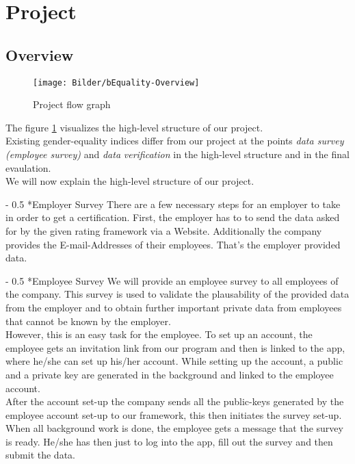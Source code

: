 \documentclass[portrait,a4paper]{article}
\makeatletter
\renewcommand\paragraph{\@startsection{paragraph}{4}{0mm}%
	{-\baselineskip}%
	{0.5\baselineskip}%
	{\normalfont\bfseries}%
}%
\makeatother
\begin{document}
\section{Project}
	\subsection{Overview}
		\begin{figure}[H]
			\texttt{[image: Bilder/bEquality-Overview]}
			\caption{Project flow graph}
			\label{Project_flow_graph}
		\end{figure}

		The figure \ref{Project_flow_graph} visualizes the high-level structure of our project.\\
		Existing gender-equality indices differ from our project at the points 
		\textit{data survey (employee survey)} and \textit{data} \textit{verification} 
		in the high-level structure and in the final evaulation.\\
		We will now explain the high-level structure of our project.

		\paragraph*{Employer Survey}
			There are a few necessary steps for an employer to take in order to get a certification.
			First, the employer has to to send the data asked for by the given rating 
			framework via a Website. Additionally the company provides the E-mail-Addresses 
			of their employees. That’s the employer provided data.

		\paragraph*{Employee Survey}
			We will provide an employee survey to all employees of the company. 
			This survey is used to validate the plausability of the 
			provided data from the employer and to obtain further important private data 
			from employees that cannot be known by the employer.\\

			However, this is an easy task for the employee. To set up an account, the employee 
			gets an invitation link from our program and then is linked to the app, 
			where he/she can set up his/her account. While setting up the account, 
			a public and a private key are generated in the background and linked to the employee account.\\
			After the account set-up the company sends all the public-keys generated by the employee 
			account set-up to our framework, this then initiates the survey set-up.\\
			When all background work is done, the employee gets a message that the survey 
			is ready. He/she has then just to log into the app, fill out the survey and then submit the data.\\
\end{document}
